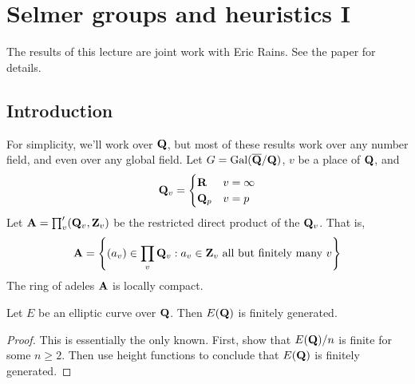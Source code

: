 
\section{Selmer groups and heuristics I}\label{sec:poonen-ii}





The results of this lecture are joint work with Eric Rains. See the paper 
\cite{pr12} for details. 





\subsection{Introduction}

For simplicity, we'll work over $\mathbf{Q}$, but most of these results work over any 
number field, and even over any global field. Let 
$G=\operatorname{Gal}(\overline{\mathbf{Q}}/\mathbf{Q})$, $v$ be a place of $\mathbf{Q}$, and 
\[
  \mathbf{Q}_v = \begin{cases}\mathbf{R} & v=\infty \\ \mathbf{Q}_p & v=p\end{cases} 
\]
Let $\mathbf{A}=\prod_v' (\mathbf{Q}_v,\mathbf{Z}_v)$ be the restricted direct product of the 
$\mathbf{Q}_v$. That is, 
\[
  \mathbf{A} = \left\{(a_v)\in \prod_v \mathbf{Q}_v:a_v\in \mathbf{Z}_v\text{ all but finitely many }v\right\}
\]
The ring of adeles $\mathbf{A}$ is locally compact. 

\begin{theo}[Mordell]
Let $E$ be an elliptic curve over $\mathbf{Q}$. Then $E(\mathbf{Q})$ is finitely generated. 
\end{theo}
\begin{proof}
This is essentially the only known. First, show that $E(\mathbf{Q})/n$ is finite for 
some $n\geqslant 2$. Then use height functions to conclude that $E(\mathbf{Q})$ is 
finitely generated. 
\end{proof}

